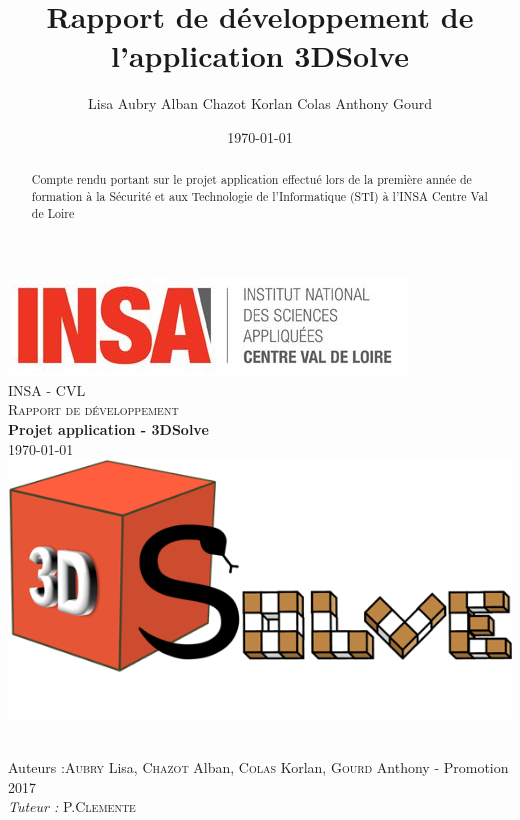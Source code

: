 \documentclass[a4paper,10pt]{report}
\title{Rapport de développement de l'application 3DSolve}
\author{Lisa Aubry Alban Chazot Korlan Colas Anthony Gourd}
\date{\today}
\begin{document}
\begin{titlepage}
  \begin{center}

    \includegraphics[scale=1]{img/insacvl.jpg}~\\[1.5cm]

    \textsc{\LARGE INSA - CVL}\\[2cm]

    \textsc{\Large Rapport de développement}\\[1.5cm]

    { \huge \bfseries Projet application - 3DSolve\\[0.4cm] }
    \today \\[1.5cm]

    \includegraphics[scale=1]{img/Logo.png}~\\[1.5cm]

    \vfill

    Auteurs :\textsc{Aubry} Lisa, \textsc{Chazot} Alban, \textsc{Colas} Korlan, \textsc{Gourd} Anthony - Promotion 2017\\
    \emph{Tuteur :} P.\textsc{Clemente}\\
  \end{center}
\end{titlepage}

\begin{abstract}
Compte rendu portant sur le projet application effectué lors de la première année de formation à la Sécurité et aux Technologie de l'Informatique (STI) à l'INSA Centre Val de Loire
\end{abstract}
\end{document}
